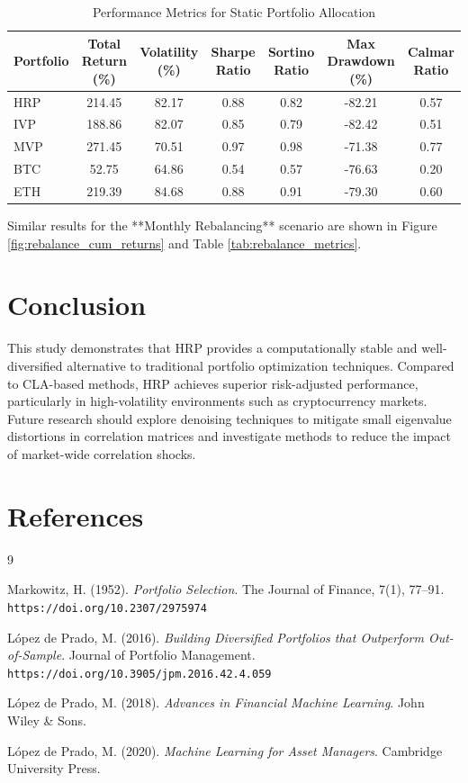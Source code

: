 \documentclass[english]{maciarticle}
\begin{document}
\begin{table}[H]
    \centering
    \caption{Performance Metrics for Static Portfolio Allocation}
    \label{tab:static_metrics}
    \small
    \begin{tabular}{|l|c|c|c|c|c|c|}
    \hline
    Portfolio & Total Return (\%) & Volatility (\%) & Sharpe Ratio & Sortino Ratio & Max Drawdown (\%) & Calmar Ratio \\
    \hline
    HRP & 214.45 & 82.17 & 0.88 & 0.82 & -82.21 & 0.57 \\
    IVP & 188.86 & 82.07 & 0.85 & 0.79 & -82.42 & 0.51 \\
    MVP & 271.45 & 70.51 & 0.97 & 0.98 & -71.38 & 0.77 \\
    BTC & 52.75 & 64.86 & 0.54 & 0.57 & -76.63 & 0.20 \\
    ETH & 219.39 & 84.68 & 0.88 & 0.91 & -79.30 & 0.60 \\
    \hline
    \end{tabular}
\end{table}

Similar results for the **Monthly Rebalancing** scenario are shown in Figure \ref{fig:rebalance_cum_returns} and Table \ref{tab:rebalance_metrics}.

\section{Conclusion}

This study demonstrates that HRP provides a computationally stable and well-diversified alternative to traditional portfolio optimization techniques. Compared to CLA-based methods, HRP achieves superior risk-adjusted performance, particularly in high-volatility environments such as cryptocurrency markets. Future research should explore denoising techniques to mitigate small eigenvalue distortions in correlation matrices and investigate methods to reduce the impact of market-wide correlation shocks.

\section*{References}

\begin{thebibliography}{9}

Markowitz, H. (1952). \textit{Portfolio Selection}. The Journal of Finance, 7(1), 77–91. \texttt{https://doi.org/10.2307/2975974}

López de Prado, M. (2016). \textit{Building Diversified Portfolios that Outperform Out-of-Sample}. Journal of Portfolio Management. \texttt{https://doi.org/10.3905/jpm.2016.42.4.059}

López de Prado, M. (2018). \textit{Advances in Financial Machine Learning}. John Wiley \& Sons.

López de Prado, M. (2020). \textit{Machine Learning for Asset Managers}. Cambridge University Press.

\end{thebibliography}
\end{document}
